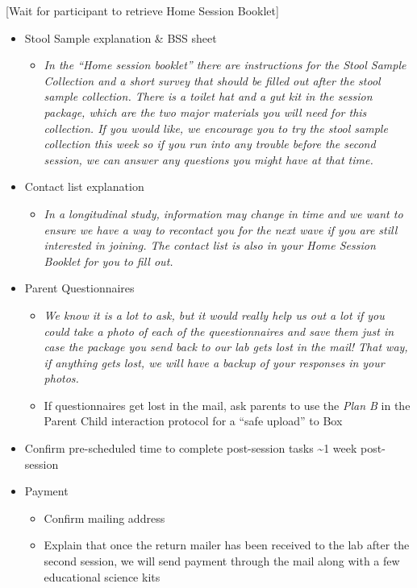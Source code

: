 \documentclass[]{book}
\providecommand{\tightlist}{%
  \setlength{\itemsep}{0pt}\setlength{\parskip}{0pt}}
\begin{document}
{[}Wait for participant to retrieve Home Session Booklet{]}

\begin{itemize}
\tightlist
\item
  Stool Sample explanation \& BSS sheet

  \begin{itemize}
  \tightlist
  \item
    \emph{In the ``Home session booklet'' there are instructions for the Stool Sample Collection and a short survey that should be filled out after the stool sample collection. There is a toilet hat and a gut kit in the session package, which are the two major materials you will need for this collection. If you would like, we encourage you to try the stool sample collection this week so if you run into any trouble before the second session, we can answer any questions you might have at that time.}
  \end{itemize}
\item
  Contact list explanation

  \begin{itemize}
  \tightlist
  \item
    \emph{In a longitudinal study, information may change in time and we want to ensure we have a way to recontact you for the next wave if you are still interested in joining. The contact list is also in your Home Session Booklet for you to fill out.}
  \end{itemize}
\item
  Parent Questionnaires

  \begin{itemize}
  \tightlist
  \item
    \emph{We know it is a lot to ask, but it would really help us out a lot if you could take a photo of each of the queestionnaires and save them just in case the package you send back to our lab gets lost in the mail! That way, if anything gets lost, we will have a backup of your responses in your photos.}
  \item
    If questionnaires get lost in the mail, ask parents to use the \emph{Plan B} in the Parent Child interaction protocol for a ``safe upload'' to Box
  \end{itemize}
\item
  Confirm pre-scheduled time to complete post-session tasks \textasciitilde{}1 week post-session
\item
  Payment

  \begin{itemize}
  \tightlist
  \item
    Confirm mailing address
  \item
    Explain that once the return mailer has been received to the lab after the second session, we will send payment through the mail along with a few educational science kits
  \end{itemize}
\end{itemize}
\end{document}

